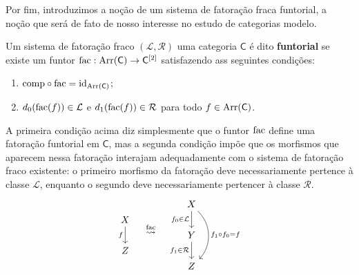 Por fim, introduzimos a noção de um sistema de fatoração fraca funtorial, a noção que será de fato de nosso interesse no estudo de categorias modelo.

\begin{defin}\label{defin:fatoracao_fraca_funtorial}
  Um sistema de fatoração fraco $(\mathcal{L},\mathcal{R})$ uma categoria $\mathsf{C}$ é dito \textbf{funtorial} se existe um funtor $\mathrm{fac}: \mathrm{Arr}(\mathsf{C}) \to \mathsf{C}^{[2]}$ satisfazendo ass seguintes condições:
  \begin{enumerate}
  \item $\mathrm{comp} \circ \mathrm{fac} = \mathrm{id}_{\mathrm{Arr}(\mathsf{C})}$;
    
  \item $d_{0}(\mathrm{fac}(f)) \in \mathcal{L}$ e $d_{1}(\mathrm{fac}(f)) \in \mathcal{R}$ para todo $f \in \mathrm{Arr}(\mathsf{C})$.
  \end{enumerate}
\end{defin}

A primeira condição acima diz simplesmente que o funtor $\mathrm{fac}$ define uma fatoração funtorial em $\mathsf{C}$, mas a segunda condição impõe que os morfismos que aparecem nessa fatoração interajam adequadamente com o sistema de fatoração fraco existente: o primeiro morfismo da fatoração deve necessariamente pertence à classe $\mathcal{L}$, enquanto o segundo deve necessariamente pertencer à classe $\mathcal{R}$.
\begin{displaymath}
  \begin{tikzcd}
    X
    \arrow[d, "f" swap]
    \\ Z
  \end{tikzcd}
  \quad \overset{\fac}{\rightsquigarrow} \quad
  \begin{tikzcd}
    X
    \arrow[d, "f_{0} \in \mathcal{L}" swap]
    \arrow[dd, bend left=45, "f_{1} \circ f_{0} = f"]
    \\ Y
    \arrow[d, "f_{1} \in \mathcal{R}" swap]
    \\ Z
  \end{tikzcd}
\end{displaymath}

